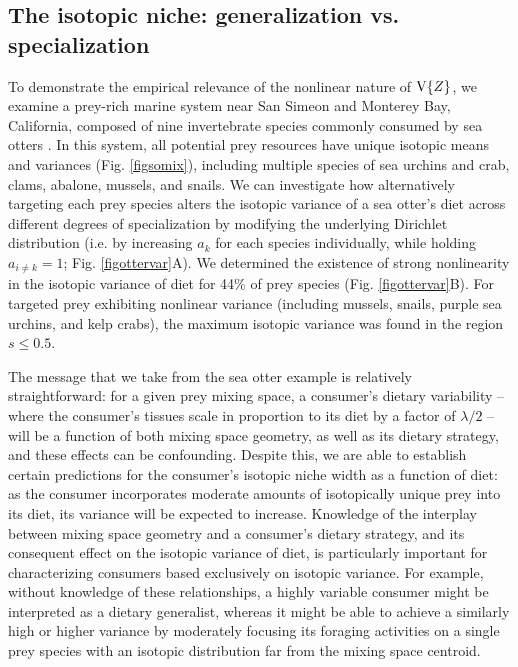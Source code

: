 \documentclass{frontiersSCNS}
\begin{document}
\subsection*{The isotopic niche: generalization vs. specialization}



To demonstrate the empirical relevance of the nonlinear nature of ${\rm V}\{Z\}$, we examine a prey-rich marine system near San Simeon and Monterey Bay, California, composed of nine invertebrate species commonly consumed by sea otters \citep{Tinker:2008tp}.
In this system, all potential prey resources have unique isotopic means and variances (Fig. \ref{figsomix}), including multiple species of sea urchins and crab, clams, abalone, mussels, and snails.
We can investigate how alternatively targeting each prey species alters the isotopic variance of a sea otter's diet across different degrees of specialization by modifying the underlying Dirichlet distribution (i.e. by increasing $a_k$ for each species individually, while holding $a_{i \neq k} = 1$; Fig. \ref{figottervar}A).
We determined the existence of strong nonlinearity in the isotopic variance of diet for 44\% of prey species (Fig. \ref{figottervar}B). %
For targeted prey exhibiting nonlinear variance (including mussels, snails, purple sea urchins, and kelp crabs), the maximum isotopic variance was found in the region $s \leq 0.5$.

The message that we take from the sea otter example is relatively straightforward: for a given prey mixing space, a consumer's dietary variability -- where the consumer's tissues scale in proportion to its diet by a factor of $\lambda/2$ -- will be a function of both mixing space geometry, as well as its dietary strategy, and these effects can be confounding.
Despite this, we are able to establish certain predictions for the consumer's isotopic niche width as a function of diet: as the consumer incorporates moderate amounts of isotopically unique prey into its diet, its variance will be expected to increase.
Knowledge of the interplay between mixing space geometry and a consumer's dietary strategy, and its consequent effect on the isotopic variance of diet, is particularly important for characterizing consumers based exclusively on isotopic variance.
For example, without knowledge of these relationships, a highly variable consumer might be interpreted as a dietary generalist, whereas it might be able to achieve a similarly high or higher variance by moderately focusing its foraging activities on a single prey species with an isotopic distribution far from the mixing space centroid.
\end{document}
